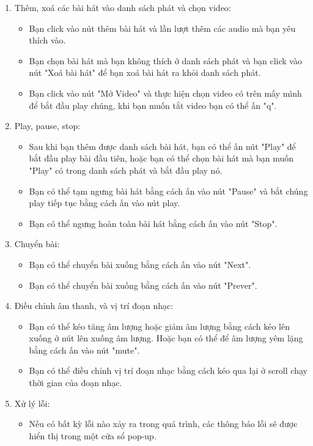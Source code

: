 \documentclass[a4paper]{article}
\begin{document}
\begin{enumerate}
\item Thêm, xoá các bài hát vào danh sách phát và chọn video:
\begin{itemize}
    \item Bạn click vào nút thêm bài hát và lần lượt thêm các audio mà bạn yêu thích vào.
    \item Bạn chọn bài hát mà bạn không thích ở danh sách phát và bạn click vào nút "Xoá bài hát" để bạn xoá bài hát ra khỏi danh sách phát.
    \item Bạn click vào nút "Mở Video" và thực hiện chọn video có trên mấy mình để bắt đầu play chúng, khi bạn muốn tắt video bạn có thể ấn "q".
\end{itemize}
\item Play, pause, stop:
\begin{itemize}
    \item Sau khi bạn thêm được danh sách bài hát, bạn có thể ấn nút "Play" để bắt đầu play bài đầu tiên, hoặc bạn có thể chọn bài hát mà bạn muốn "Play" có trong danh sách phát và bắt đầu play nó.
    \item Bạn có thể tạm ngưng bài hát bằng cách ấn vào nút "Pause" và bắt chúng play tiếp tục bằng cách ấn vào nút play.
    \item Bạn có thể ngưng hoàn toàn bài hát bằng cách ấn vào nút "Stop".
\end{itemize}
\item Chuyển bài:
\begin{itemize}
    \item Bạn có thể chuyển bài xuống bằng cách ấn vào nút "Next".
    \item Bạn có thể chuyển bài xuống bằng cách ấn vào nút "Prever".
\end{itemize}
\item Điều chỉnh âm thanh, và vị trí đoạn nhạc:
\begin{itemize}
    \item Bạn có thể kéo tăng âm lượng hoặc giảm âm lượng bằng cách kéo lên xuống ở nút lên xuống âm lượng. Hoặc bạn có thể để âm lượng yêm lặng bằng cách ấn vào nút "mute".
    \item Bạn có thể điều chỉnh vị trí đoạn nhạc bằng cách kéo qua lại ở scroll chạy thời gian của đoạn nhạc.
\end{itemize}
\item Xử lý lỗi:
\begin{itemize}
    \item Nếu có bất kỳ lỗi nào xảy ra trong quá trình, các thông báo lỗi sẽ được hiển thị trong một cửa sổ pop-up.
\end{itemize}
\end{enumerate}
\end{document}
